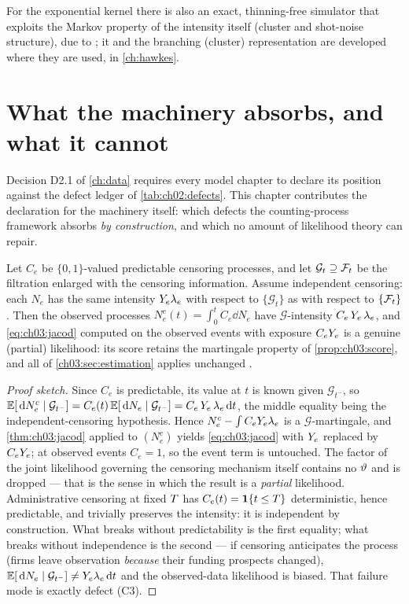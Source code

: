 For the exponential kernel there is also an exact, thinning-free
simulator that exploits the Markov property of the intensity itself
(cluster and shot-noise structure), due to \citet{dassioszhao2013}; it and
the branching (cluster) representation are developed where they are used,
in \cref{ch:hawkes}.

\section{What the machinery absorbs, and what it cannot}\label{ch03:sec:defects}

Decision D2.1 of \cref{ch:data} requires every model chapter to declare
its position against the defect ledger of \cref{tab:ch02:defects}. This
chapter contributes the declaration for the machinery itself: which
defects the counting-process framework absorbs \emph{by construction}, and
which no amount of likelihood theory can repair.

\begin{proposition}\label{prop:ch03:censoring}
Let $C_e$ be $\{0,1\}$-valued predictable censoring processes, and let
$\mathcal G_t \supseteq \mathcal{F}_{t}$ be the filtration enlarged with the censoring
information. Assume independent censoring: each $N_e$ has the same
intensity $Y_e\lambda_e$ with respect to $\{\mathcal G_t\}$ as with
respect to $\{\mathcal{F}_{t}\}$. Then the observed processes
$N_e^{c}(t) = \int_0^t C_e \dd N_e$ have $\mathcal G$-intensity
$C_e\,Y_e\,\lambda_e$, and \cref{eq:ch03:jacod} computed on the
observed events with exposure $C_eY_e$ is a genuine (partial)
likelihood: its score retains the martingale property of
\cref{prop:ch03:score}, and all of \cref{ch03:sec:estimation} applies
unchanged \citep[III.2]{abgk1993}.
\end{proposition}

\begin{proof}[Proof sketch]
Since $C_e$ is predictable, its value at $t$ is known given
$\mathcal G_{t^-}$, so
$\mathbb{E}[\,\mathrm{d} N^c_e \mid \mathcal G_{t^-}] = C_e(t)\,\mathbb{E}[\,\mathrm{d} N_e \mid \mathcal
G_{t^-}] = C_e\,Y_e\,\lambda_e\,\mathrm{d} t$, the middle equality being the
independent-censoring hypothesis. Hence
$N^c_e - \int C_e Y_e \lambda_e$ is a $\mathcal G$-martingale, and
\cref{thm:ch03:jacod} applied to $(N^c_e)$ yields
\cref{eq:ch03:jacod} with $Y_e$ replaced by $C_eY_e$; at
observed events $C_e = 1$, so the event term is untouched. The factor of
the joint likelihood governing the censoring mechanism itself contains no
$\vartheta$ and is dropped --- that is the sense in which the result is
a \emph{partial} likelihood. Administrative censoring at fixed $T$
has $C_e(t) = \mathbf{1}\{t \le T\}$ deterministic, hence predictable, and
trivially preserves the intensity: it is independent by construction.
What breaks without predictability is the first equality; what breaks
without independence is the second --- if censoring anticipates the
process (firms leave observation \emph{because} their funding prospects
changed), $\mathbb{E}[\,\mathrm{d} N_e \mid \mathcal G_{t^-}] \neq Y_e\lambda_e\,\mathrm{d} t$ and
the observed-data likelihood is biased. That failure mode is exactly
defect (C3).
\end{proof}

